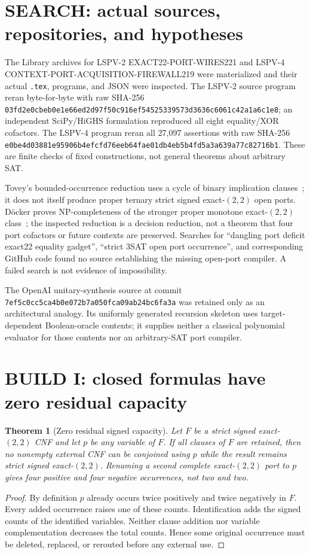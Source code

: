 \documentclass[11pt]{article}
\newtheorem{theorem}{Theorem}
\begin{document}
\section{SEARCH: actual sources, repositories, and hypotheses}
The Library archives for LSPV-2 EXACT22-PORT-WIRES221 and LSPV-4
CONTEXT-PORT-ACQUISITION-FIREWALL219 were materialized and their actual
\texttt{.tex}, programs, and JSON were inspected. The LSPV-2 source program
reran byte-for-byte with raw SHA-256
\texttt{03fd2e0cbeb0e1e66ed2d97f50c916ef54525339573d3636c6061c42a1a6c1e8};
an independent SciPy/HiGHS formulation reproduced all eight equality/XOR
cofactors. The LSPV-4 program reran all 27,097 assertions with raw SHA-256
\texttt{e0be4d03881e95906b4efcfd76eeb64fae01db4eb5b4fd5a3a639a77c82716b1}.
These are finite checks
of fixed constructions, not general theorems about arbitrary SAT.

Tovey's bounded-occurrence reduction uses a cycle of binary implication
clauses~\cite{Tovey}; it does not itself produce proper ternary strict signed
exact-$(2,2)$ open ports. D\"ocker proves NP-completeness of the stronger
proper monotone exact-$(2,2)$ class~\cite{Docker}; the inspected reduction is
a decision reduction, not a theorem that four port cofactors or future
contexts are preserved. Searches for ``dangling port deficit exact22 equality
gadget'', ``strict 3SAT open port occurrence'', and corresponding GitHub code
found no source establishing the missing open-port compiler. A failed search
is not evidence of impossibility.

The OpenAI unitary-synthesis source at commit
\texttt{7ef5c0cc5ca4b0e072b7a050fca09ab24bc6fa3a} was retained only as an
architectural analogy. Its uniformly generated recursion skeleton uses
target-dependent Boolean-oracle contents; it supplies neither a classical
polynomial evaluator for those contents nor an arbitrary-SAT port compiler.

\section{BUILD I: closed formulas have zero residual capacity}
\begin{theorem}[Zero residual signed capacity]\label{thm:zero}
Let $F$ be a strict signed exact-$(2,2)$ CNF and let $p$ be any variable of
$F$. If all clauses of $F$ are retained, then no nonempty external CNF can be
conjoined using $p$ while the result remains strict signed exact-$(2,2)$.
Renaming a second complete exact-$(2,2)$ port to $p$ gives four positive and
four negative occurrences, not two and two.
\end{theorem}
\begin{proof}
By definition $p$ already occurs twice positively and twice negatively in
$F$. Every added occurrence raises one of these counts. Identification adds
the signed counts of the identified variables. Neither clause addition nor
variable complementation decreases the total counts. Hence some original
occurrence must be deleted, replaced, or rerouted before any external use.
\end{proof}
\end{document}
